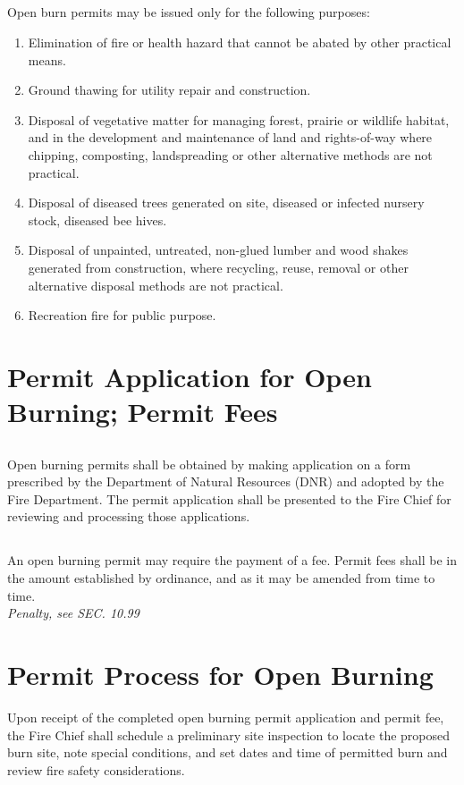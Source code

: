 \subsection{}
Open burn permits may be issued only for the following purposes:
\begin{enumerate}[{\indent}1)]
    \item Elimination of fire or health hazard that cannot be abated by other practical means.
    \item Ground thawing for utility repair and construction.
    \item Disposal of vegetative matter for managing forest, prairie or wildlife habitat, and in the development and maintenance of land and rights-of-way where chipping, composting, landspreading or other alternative methods are not practical.
    \item Disposal of diseased trees generated on site, diseased or infected nursery stock, diseased bee hives.
    \item Disposal of unpainted, untreated, non-glued lumber and wood shakes generated from construction, where recycling, reuse, removal or other alternative disposal methods are not practical.
    \item Recreation fire for public purpose.
\end{enumerate}
\section{Permit Application for Open Burning; Permit Fees}
\subsection{}
Open burning permits shall be obtained by making application on a form prescribed by the Department of Natural Resources (DNR) and adopted by the Fire Department.  The permit application shall be presented to the Fire Chief for reviewing and processing those applications.
\subsection{}
An open burning permit may require the payment of a fee.  Permit fees shall be in the amount established by ordinance, and as it may be amended from time to time.\\
\emph{Penalty, see SEC. 10.99}
\section{Permit Process for Open Burning}
Upon receipt of the completed open burning permit application and permit fee, the Fire Chief shall schedule a preliminary site inspection to locate the proposed burn site, note special conditions, and set dates and time of permitted burn and review fire safety considerations.
